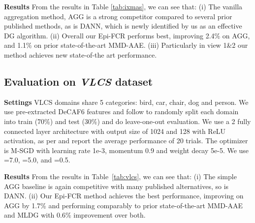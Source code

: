 \documentclass[10pt,twocolumn,letterpaper]{article}
\newcommand{\doublecheck}[1]{\textcolor{black}{#1}}
\newcommand{\keypoint}[1]{\vspace{0.1cm}\noindent\textbf{#1}\quad}
\newcommand{\cut}[1]{}
\begin{document}
\keypoint{Results} From the results in Table \ref{tab:ixmas}, we can see that: (i) The vanilla aggregation method, AGG is a strong competitor compared to several prior published methods, as is DANN, which is newly identified by us as an effective DG algorithm. (ii) Overall our Epi-FCR performs best, improving 2.4\% on AGG, and 1.1\% on prior state-of-the-art MMD-AAE. (iii) Particularly in view 1\&2 our method achieves new state-of-the art performance. 


\subsection{Evaluation on \textbf{\textit{VLCS}} dataset}

\keypoint{Settings} VLCS domains share 5 categories: bird, car, chair, dog and person. We use  pre-extracted DeCAF6 features and follow \cite{motiian2017CCSA} to randomly split each domain into train (70\%) and test (30\%) and do leave-one-out evaluation. We use a 2 fully connected layer architecture with output size of 1024 and 128 with ReLU activation, as per \cite{motiian2017CCSA} and report the average performance of 20 trials. The optimizer is M-SGD with learning rate 1e-3, momentum 0.9 and weight decay 5e-5. We use =7.0, =5.0, and =0.5. 



\keypoint{Results} From the results in Table~\ref{tab:vlcs}, we can see that: (i) The simple AGG baseline is again competitive with many published alternatives, so is DANN.  (ii) Our Epi-FCR method achieves the best performance, improving on AGG by 1.7\% and performing comparably to prior state-of-the-art MMD-AAE and MLDG with  0.6\% improvement over both. 




\cut{\keypoint{Sensitivity analysis of loss weights} \doublecheck{We did some analysis to check to check the sensitivity of the model to the different loss weights, ie, . First we activate the loss weight , its value is selected from , we can see that the model performance stably increases upon the increase of  where it reaches a peak performance when . Second, we activate the loss weight , similarly its value is obtained from . Training classifier is not as stable as training the feature extractor, its performance fluctuates upon the change of . Then, we check the loss weight  by choosing it from , it is seen that slightly activating it gives some performance boost indicating its strong constraint to the feature extractor. But we need to be careful of controlling it as we see the performance drops when we make this constraint stronger.}}
\end{document}
